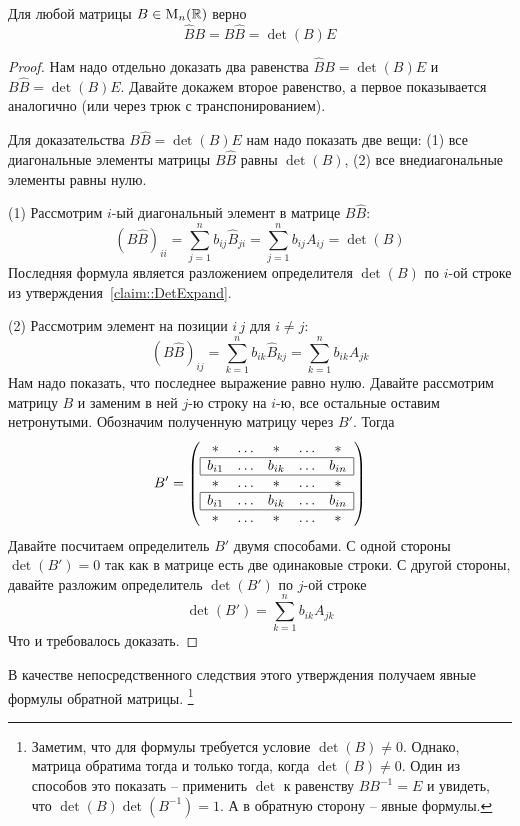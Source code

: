 \begin{claim}
\label{claim::InvMatExplicite}
Для любой матрицы $B\in \operatorname{M}_{n}(\mathbb R)$ верно 
\[
\hat B B = B\hat B = \det(B) E
\]
\end{claim}
\begin{proof}
Нам надо отдельно доказать два равенства $\hat B B = \det (B) E$ и $B\hat B = \det (B) E$.
Давайте докажем второе равенство, а первое показывается аналогично (или через трюк с транспонированием).

Для доказательства $B\hat B = \det (B) E$ нам надо показать две вещи:
(1) все диагональные элементы матрицы $B\hat B$ равны $\det (B)$, (2) все внедиагональные элементы равны нулю.

(1) Рассмотрим $i$-ый диагональный элемент в матрице $B\hat B$:
\[
(B\hat B)_{ii} = \sum_{j=1}^n b_{ij}\hat B_{ji} = \sum_{j=1}^n b_{ij}A_{ij}=\det(B)
\]
Последняя формула является разложением определителя $\det (B)$ по $i$-ой строке из утверждения~\ref{claim::DetExpand}.

(2) Рассмотрим элемент на позиции $i\,j$ для $i\neq j$:
\[
(B\hat B)_{ij} = \sum_{k=1}^n b_{ik}\hat B_{kj} = \sum_{k=1}^n b_{ik}A_{jk}
\]
Нам надо показать, что последнее выражение равно нулю.
Давайте рассмотрим матрицу $B$ и заменим в ней $j$-ю строку на $i$-ю, все остальные оставим нетронутыми.
Обозначим полученную матрицу через $B'$.
Тогда
\[
B' =
\left(
\begin{array}{ccccc}
{*}&{\ldots}&{*}&{\ldots}&{*}\\
\hline
\multicolumn{1}{|c}{b_{i1}}&{\ldots}&{b_{ik}}&{\ldots}&\multicolumn{1}{c|}{b_{in}}\\
\hline
{*}&{\ldots}&{*}&{\ldots}&{*}\\
\hline
\multicolumn{1}{|c}{b_{i1}}&{\ldots}&{b_{ik}}&{\ldots}&\multicolumn{1}{c|}{b_{in}}\\
\hline
{*}&{\ldots}&{*}&{\ldots}&{*}\\
\end{array}
\right)
\]
Давайте посчитаем определитель $B'$ двумя способами.
С одной стороны $\det(B') = 0$ так как в матрице есть две одинаковые строки.
С другой стороны, давайте разложим определитель $\det(B')$ по $j$-ой строке
\[
\det (B') = \sum_{k=1}^n b_{ik}A_{jk}
\]
Что и требовалось доказать.
\end{proof}

В качестве непосредственного следствия этого утверждения получаем явные формулы обратной матрицы.%
\footnote{Заметим, что для формулы требуется условие $\det (B)\neq 0$.
Однако, матрица обратима тогда и только тогда, когда $\det(B)\neq 0$.
Один из способов это показать -- применить $\det$ к равенству $B B^{-1} = E$ и увидеть, что $\det(B) \det(B^{-1}) = 1$.
А в обратную сторону -- явные формулы.}

